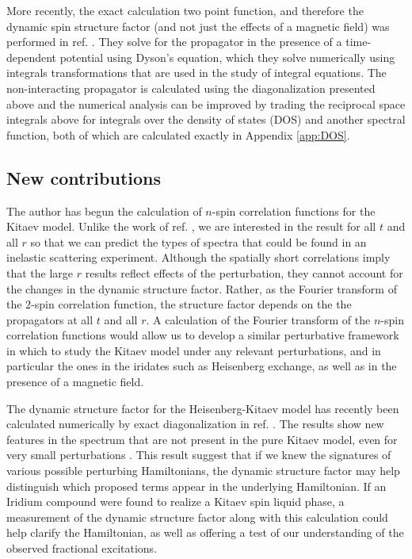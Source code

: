 \documentclass[aps,pra,preprint,groupedaddress]{revtex4-1}
\newcommand{\1}{\mathds{1}}
\begin{document}
More recently, the exact calculation two point function, and therefore the dynamic spin structure factor (and not just the effects of a magnetic field) was performed in ref. . %
They solve for the propagator in the presence of a time-dependent potential using Dyson's equation, which they solve numerically using integrals transformations that are used in the study of integral equations. The non-interacting propagator is calculated using the diagonalization presented above and the numerical analysis can be improved by trading the reciprocal space integrals above for integrals over the density of states (DOS) and another spectral function, both of which are calculated exactly in Appendix \ref{app:DOS}.

\subsection{New contributions}

The author has begun the calculation of $n$-spin correlation functions for the Kitaev model. Unlike the work of ref. , we are interested in the result for all $t$ and all $r$ so that we can predict the types of spectra that could be found in an inelastic scattering experiment. Although the spatially short correlations imply that the large $r$ results reflect effects of the perturbation, they cannot account for the changes in the dynamic structure factor. Rather, as the Fourier transform of the $2$-spin correlation function, the structure factor depends on the the propagators at all $t$ and all $r$. A calculation of the Fourier transform of the $n$-spin correlation functions would allow us to develop a similar perturbative framework in which to study the Kitaev model under any relevant perturbations, and in particular the ones in the iridates such as Heisenberg exchange, as well as in the presence of a magnetic field.

The dynamic structure factor for the Heisenberg-Kitaev model has recently been calculated numerically by exact diagonalization in ref. . The results show new features in the spectrum that are not present in the pure Kitaev model, even for very small perturbations \cite{Trousselet}. This result suggest that if we knew the signatures of various possible perturbing Hamiltonians, the dynamic structure factor may help distinguish which proposed terms appear in the underlying Hamiltonian. If an Iridium compound were found to realize a Kitaev spin liquid phase, a measurement of the dynamic structure factor along with this calculation could help clarify the Hamiltonian, as well as offering a test of our understanding of the observed fractional excitations.   
\end{document}
